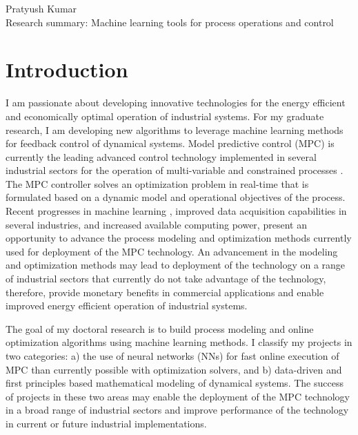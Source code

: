 \documentclass[11pt, a4paper]{article} %
\begin{document}
\noindent \large{Pratyush Kumar}
\vspace{0.1in} \\
Research summary: Machine learning tools for process operations and control
\normalsize	

\vspace{0.1in}
\section*{Introduction}

I am passionate about developing innovative technologies for the energy 
efficient and economically optimal operation of industrial systems. For my 
graduate research, I am developing new algorithms to leverage machine learning 
methods for feedback control of dynamical systems. Model predictive control 
(MPC) is currently the leading advanced control technology implemented 
in several industrial sectors for the operation of multi-variable and 
constrained processes \citep{darby:nikolaou:2012}. The MPC controller solves an 
optimization problem in real-time that is formulated based on a dynamic model 
and operational objectives of the process. Recent progresses in machine 
learning \citep{lecun:bengio:hinton:2015}, improved data acquisition 
capabilities in several industries, and increased available computing power, 
present an opportunity to advance the process modeling and optimization methods 
currently used for deployment of the MPC technology. An advancement in the 
modeling and optimization methods may lead to deployment of the 
technology on a range of industrial sectors that currently do not take 
advantage of the technology, therefore, provide monetary benefits 
in commercial applications and enable improved energy efficient operation of 
industrial systems.

The goal of my doctoral research is to build process modeling and online 
optimization algorithms using machine learning methods. I classify 
my projects in two categories: a) the use of neural networks (NNs) for 
fast online execution of MPC than currently possible with optimization solvers, 
and b) data-driven and first principles based mathematical modeling of 
dynamical systems. The success of projects in these two areas may enable 
the deployment of the MPC technology in a broad range of industrial sectors and 
improve performance of the technology in current or future industrial 
implementations.
\end{document}
